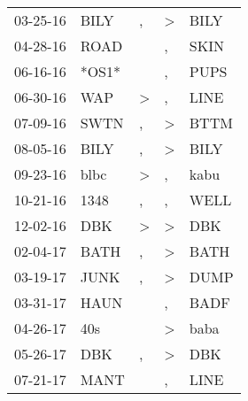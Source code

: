 \begin{supertabular}{p{0.07\textwidth}p{0.06\textwidth}p{0.02\textwidth}p{0.02\textwidth}p{0.06\textwidth}}
          03-25-16\textsuperscript{} &           BILY\textsuperscript{} &                , &  \textgreater &           BILY\textsuperscript{} \\
          04-28-16\textsuperscript{} &           ROAD\textsuperscript{} &                  &             , &           SKIN\textsuperscript{} \\
          06-16-16\textsuperscript{} &                            *OS1* &                  &             , &           PUPS\textsuperscript{} \\
          06-30-16\textsuperscript{} &            WAP\textsuperscript{} &     \textgreater &             , &           LINE\textsuperscript{} \\
          07-09-16\textsuperscript{} &           SWTN\textsuperscript{} &                , &  \textgreater &           BTTM\textsuperscript{} \\
          08-05-16\textsuperscript{} &           BILY\textsuperscript{} &                , &  \textgreater &           BILY\textsuperscript{} \\
          09-23-16\textsuperscript{} &           blbc\textsuperscript{} &     \textgreater &             , &           kabu\textsuperscript{} \\
          10-21-16\textsuperscript{} &           1348\textsuperscript{} &                , &             , &           WELL\textsuperscript{} \\
          12-02-16\textsuperscript{} &            DBK\textsuperscript{} &     \textgreater &  \textgreater &            DBK\textsuperscript{} \\
          02-04-17\textsuperscript{} &           BATH\textsuperscript{} &                , &  \textgreater &           BATH\textsuperscript{} \\
          03-19-17\textsuperscript{} &           JUNK\textsuperscript{} &                , &  \textgreater &           DUMP\textsuperscript{} \\
          03-31-17\textsuperscript{} &           HAUN\textsuperscript{} &                  &             , &           BADF\textsuperscript{} \\
          04-26-17\textsuperscript{} &            40s\textsuperscript{} &                  &  \textgreater &           baba\textsuperscript{} \\
          05-26-17\textsuperscript{} &            DBK\textsuperscript{} &                , &  \textgreater &            DBK\textsuperscript{} \\
          07-21-17\textsuperscript{} &           MANT\textsuperscript{} &                  &             , &           LINE\textsuperscript{} \\

\end{supertabular}
